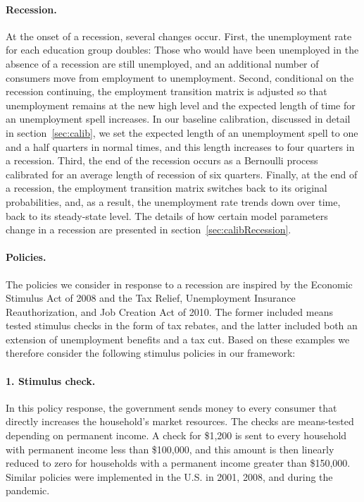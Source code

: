 \documentclass[qe]{econsocart}
\begin{document}
\paragraph{Recession.} At the onset of a recession, several changes occur.
First, the unemployment rate for each education group doubles: Those who would have been unemployed in the absence of a recession are still unemployed, and an additional number of consumers move from employment to unemployment.
Second, conditional on the recession continuing, the employment transition matrix is adjusted so that unemployment remains at the new high level and the expected length of time for an unemployment spell increases. In our baseline calibration, discussed in detail in section~\ref{sec:calib}, we set the expected length of an unemployment spell to one and a half quarters in normal times, and this length increases to four quarters in a recession.
Third, the end of the recession occurs as a Bernoulli process calibrated for an average length of recession of six quarters.
Finally, at the end of a recession, the employment transition matrix switches back to its original probabilities, and, as a result, the unemployment rate trends down over time, back to its steady-state level. The details of how certain model parameters change in a recession are presented in section~\ref{sec:calibRecession}.

\paragraph{Policies.} The policies we consider in response to a recession are inspired by the Economic Stimulus Act of 2008 and the Tax Relief, Unemployment Insurance Reauthorization, and Job Creation Act of 2010.
The former included means tested stimulus checks in the form of tax rebates, and the latter included both an extension of unemployment benefits and a tax cut.
Based on these examples we therefore consider the following stimulus policies in our framework:

\paragraph{1.
  Stimulus check.} In this policy response, the government sends money to every consumer that directly increases the household's market resources.
The checks are means-tested depending on permanent income.
A check for \$1,200 is sent to every household with permanent income less than \$100,000, and this amount is then linearly reduced to zero for households with a permanent income greater than \$150,000.
Similar policies were implemented in the U.S.
in 2001, 2008, and during the pandemic.
\end{document}
